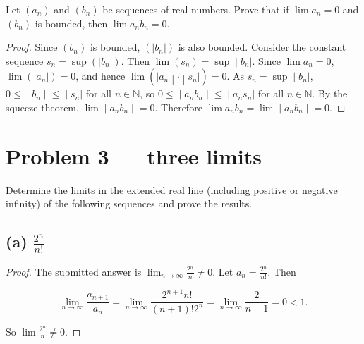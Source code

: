 Let \(\left( a_{n} \right)\) and \(\left( b_{n} \right)\) be sequences of real numbers. Prove that if \(\lim a_{n} = 0\) and \(\left( b_{n} \right)\) is bounded, then \(\lim a_{n}b_{n} = 0\).

\begin{proof}

Since \(\left( b_{n} \right)\) is bounded, \(\left( {|b_{n}|} \right)\) is also bounded. Consider the constant sequence \(s_{n} = \sup\left( {|b_{n}|} \right)\). Then \(\left. \lim\left( s_{n} \right) = \sup \middle| b_{n}| \right.\). Since \(\lim a_{n} = 0\), \(\lim\left( {|a_{n}|} \right) = 0\), and hence \(\lim\left( |a_{n} \middle| \cdot \middle| s_{n}| \right) = 0\). As \(\left. s_{n} = \sup \middle| b_{n}| \right.\), \(\left. 0 \leq \middle| b_{n} \middle| \leq \middle| s_{n}| \right.\) for all \(n \in \mathbb{N}\), so \(\left. 0 \leq \middle| a_{n}b_{n} \middle| \leq \middle| a_{n}s_{n}| \right.\) for all \(n \in \mathbb{N}\). By the squeeze theorem, \(\left. \lim \middle| a_{n}b_{n} \middle| = 0 \right.\). Therefore \(\left. \lim a_{n}b_{n} = \lim \middle| a_{n}b_{n} \middle| = 0 \right.\).

\end{proof}

\section{Problem 3 --- three limits}

Determine the limits in the extended real line (including positive or negative infinity) of the following sequences and prove the results.

\subsection{\texorpdfstring{(a) \(\frac{2^{n}}{n!}\)}{(a) \textbackslash frac\{2\^{}\{n\}\}\{n!\}}}

\begin{proof}

The submitted answer is \(\lim_{n\rightarrow\infty}\frac{2^{n}}{n} \neq 0\). Let \(a_{n} = \frac{2^{n}}{n!}\). Then

\[\lim\limits_{n\rightarrow\infty}\frac{a_{n + 1}}{a_{n}} = \lim\limits_{n\rightarrow\infty}\frac{2^{n + 1}n!}{\left( {n + 1} \right)!2^{n}} = \lim\limits_{n\rightarrow\infty}\frac{2}{n + 1} = 0 < 1.\]

So \(\lim\frac{2^{n}}{n} \neq 0\).

\end{proof}

